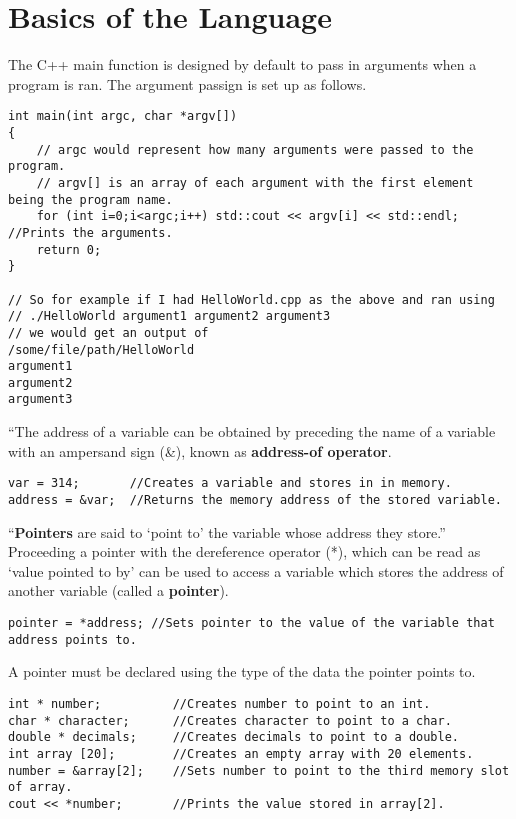 \section{Basics of the Language}

The C++ main function is designed by default to pass in arguments when a program is ran. The argument passign is set up as follows.
\begin{lstlisting}
int main(int argc, char *argv[])
{
	// argc would represent how many arguments were passed to the program.
	// argv[] is an array of each argument with the first element being the program name.
	for (int i=0;i<argc;i++) std::cout << argv[i] << std::endl; //Prints the arguments.
	return 0;
}

// So for example if I had HelloWorld.cpp as the above and ran using
// ./HelloWorld argument1 argument2 argument3
// we would get an output of 
/some/file/path/HelloWorld
argument1
argument2
argument3
\end{lstlisting}

``The address of a variable can be obtained by preceding the name of a variable with an ampersand sign (\&), known as \textbf{address-of operator}. \cite{cpp:pointers}
\begin{lstlisting}
var = 314;       //Creates a variable and stores in in memory.
address = &var;  //Returns the memory address of the stored variable.
\end{lstlisting}

``\textbf{Pointers} are said to `point to' the variable whose address they store.'' \cite{cpp:pointers} Proceeding a pointer with the dereference operator (*), which can be read as `value pointed to by' can be used to access a variable which stores the address of another variable (called a \textbf{pointer}).
\begin{lstlisting}
pointer = *address; //Sets pointer to the value of the variable that address points to.
\end{lstlisting}

A pointer must be declared using the type of the data the pointer points to.
\begin{lstlisting}
int * number;          //Creates number to point to an int.
char * character;      //Creates character to point to a char.
double * decimals;     //Creates decimals to point to a double.
int array [20];        //Creates an empty array with 20 elements.
number = &array[2];    //Sets number to point to the third memory slot of array.
cout << *number;       //Prints the value stored in array[2].
\end{lstlisting}

